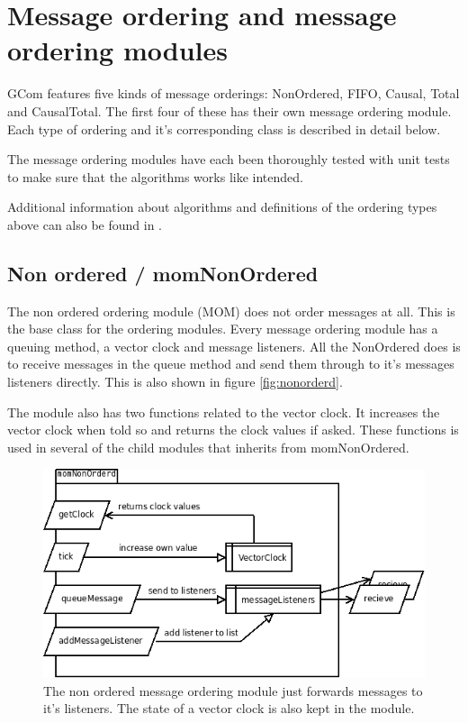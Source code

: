 \documentclass[english]{article}
\begin{document}
\section{Message ordering and message ordering modules}
\label{messageordering}
GCom features five kinds of message orderings: NonOrdered, FIFO, Causal, Total and CausalTotal. The first four of these has their own message ordering module. Each type of ordering and it's corresponding class is described in detail below.

The message ordering modules have each been thoroughly tested with unit tests to make sure that the algorithms works like intended.

Additional information about algorithms and definitions of the ordering types above can also be found in \cite{distsys-ordering}.

\subsection{Non ordered / momNonOrdered}
The non ordered ordering module (MOM) does not order messages at all. This is the base class for the ordering modules. Every message ordering module has a queuing method, a vector clock and message listeners. All the NonOrdered does is to receive messages in the queue method and send them through to it's messages listeners directly. This is also shown in figure \vref{fig:nonorderd}.

The module also has two functions related to the vector clock. It increases the vector clock when told so and returns the clock values if asked. These functions is used in several of the child modules that inherits from momNonOrdered.

\begin{figure}
\includegraphics[width=\textwidth]{momNonOrderd.png}
\caption{The non ordered message ordering module just forwards messages to it's listeners. The state of a vector clock is also kept in the module.}
\label{fig:nonorderd}
\end{figure}
\end{document}

